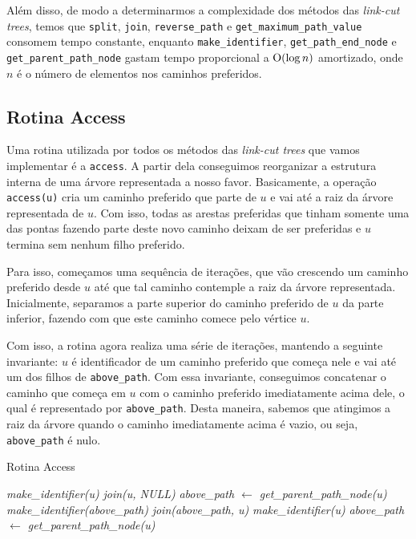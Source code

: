 Além disso, de modo a determinarmos a complexidade dos métodos das \emph{link-cut trees}, temos que \texttt{split}, \texttt{join}, \texttt{reverse\_path} e \texttt{get\_maximum\_path\_value} consomem tempo constante, enquanto \texttt{make\_identifier}, \texttt{get\_path\_end\_node} e \texttt{get\_parent\_path\_node} gastam tempo proporcional a $\mathrm{O}(\log n)$ amortizado, onde $n$ é o número de elementos nos caminhos preferidos.

\subsection{Rotina Access}
\label{subsection:lct-access}

Uma rotina utilizada por todos os métodos das \emph{link-cut trees} que vamos implementar é a \texttt{access}. A partir dela conseguimos reorganizar a estrutura interna de uma árvore representada a nosso favor. Basicamente, a operação \texttt{access(u)} cria um caminho preferido que parte de $u$ e vai até a raiz da árvore representada de $u$. Com isso, todas as arestas preferidas que tinham somente uma das pontas fazendo parte deste novo caminho deixam de ser preferidas e $u$ termina sem nenhum filho preferido.

Para isso, começamos uma sequência de iterações, que vão crescendo um caminho preferido desde $u$ até que tal caminho contemple a raiz da árvore representada. Inicialmente, separamos a parte superior do caminho preferido de $u$ da parte inferior, fazendo com que este caminho comece pelo vértice $u$.

Com isso, a rotina agora realiza uma série de iterações, mantendo a seguinte invariante: $u$ é identificador de um caminho preferido que começa nele e vai até um dos filhos de \texttt{above\_path}. Com essa invariante, conseguimos concatenar o caminho que começa em $u$ com o caminho preferido imediatamente acima dele, o qual é representado por \texttt{above\_path}. Desta maneira, sabemos que atingimos a raiz da árvore quando o caminho imediatamente acima é vazio, ou seja, \texttt{above\_path} é nulo.

\begin{algorithm}[h!]
    \caption{Rotina Access}\label{lct:access}
    \begin{algorithmic}[1]
        \State \emph{make\_identifier(u)}
        \State \emph{join(u, NULL)}
        \State \emph{above\_path $\gets$ get\_parent\_path\_node(u)}
        \State {}
        \State \emph{make\_identifier(above\_path)}
        \State {}
        \State \emph{join(above\_path, u)}
        \State \emph{make\_identifier(u)}
        \State \emph{above\_path $\gets$ get\_parent\_path\_node(u)}
        \EndWhile
        \EndFunction
    \end{algorithmic}
\end{algorithm}

